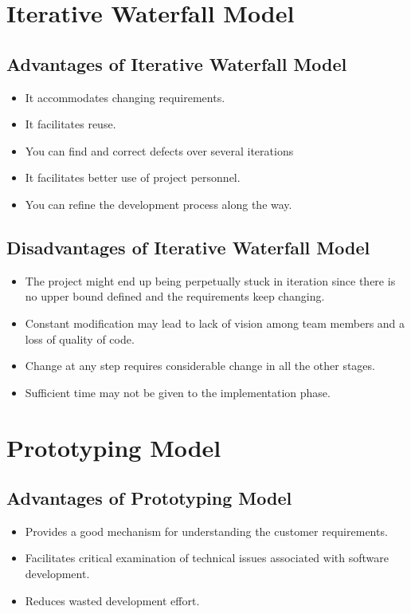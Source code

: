 \documentclass{article}
\begin{document}
\newpage{}
\section{Iterative Waterfall Model}
\subsection{Advantages of Iterative Waterfall Model}
\begin{itemize}
\item It accommodates changing requirements.
\item     It facilitates reuse.
\item         You can find and correct defects over several iterations
\item             It facilitates better use of project personnel. 
\item                     You can refine the development process along the way. 
\end{itemize}
\subsection{Disadvantages of Iterative Waterfall Model}
\begin{itemize}
\item The project might end up being perpetually stuck in iteration since there is no upper bound defined and the requirements keep changing.
\item Constant modification may lead to lack of vision among team members and a loss of quality of code.
\item Change at any step requires considerable change in all the other stages.
\item Sufficient time may not be given to the implementation phase.
\end{itemize}

\newpage{}
\section{Prototyping Model}
\subsection{Advantages of Prototyping Model}
\begin{itemize}
\item Provides a good mechanism for understanding the customer requirements.
\item     Facilitates critical examination of technical issues associated with software development.
\item         Reduces wasted development effort.
\end{itemize}
\end{document}
